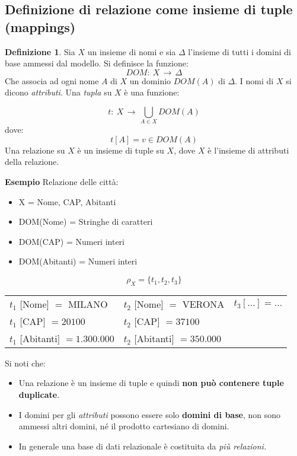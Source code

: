 \documentclass[a4paper, 10pt]{article}
\theoremstyle{definition}
\newtheorem*{defn}{Definizione}
\begin{document}
		\subsection*{Definizione di relazione come insieme di tuple (mappings)}
		\begin{defn}
			Sia $X$ un insieme di nomi e sia $\Delta$ l'insieme di tutti i domini di
			base ammessi dal modello. Si definisce la funzione:
			\[
				DOM: \: X \, \rightarrow \, \Delta
			\]
			Che associa ad ogni nome $A$ di $X$ un dominio $DOM(A)$ di $\Delta$. 
			I nomi di $X$ si dicono \emph{attributi}.
			Una \emph{tupla} su $X$ è una funzione:
		
			\[
				t : \: X \, \rightarrow \, \bigcup_{A \in X} DOM (A) 
			\]
			dove:
			\[
				t [ A ] = v \in DOM (A)
			\]
			Una relazione su $X$ è un insieme di tuple su $X$, dove $X$ è
			l'insieme di attributi della relazione.
		\end{defn}
		
		\textbf{Esempio}
		Relazione delle città:
		\begin{itemize}
			\item X = {Nome, CAP, Abitanti}
			\item DOM(Nome) = Stringhe di caratteri
			\item DOM(CAP) = Numeri interi
			\item DOM(Abitanti) = Numeri interi
		\end{itemize}
		\[
			\rho_X = \{ t_1 , t_2 , t_3 \}
		\]
		\begin{tabular}{lll}
			$t_1$ [Nome] $=$ MILANO & $t_2$ [Nome] $=$ VERONA & $t_3 [\dots] = \dots$ \\
			$t_1$ [CAP] $= 20100$ & $t_2$ [CAP] $= 37100$ & \\
			$t_1$ [Abitanti] $= 1.300.000$ & $t_2$ [Abitanti] $= 350.000$ & 
		\end{tabular}
		
		\bigskip 
		
		Si noti che:
		\begin{itemize}
			\item Una relazione è un insieme di tuple e quindi \textbf{non può
			contenere tuple duplicate}.
			\item I domini per gli \textit{attributi} possono essere solo  \textbf{domini di base},
			non sono ammessi altri domini, né il prodotto cartesiano di
			domini.
			\item In generale una base di dati relazionale è costituita da\textit{ più
			relazioni.}
		\end{itemize}
		
\end{document}
